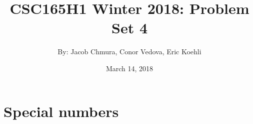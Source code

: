 \documentclass[12pt, a4paper]{amsart}
\theoremstyle{definition}
\theoremstyle{remark}
\numberwithin{Theorem}{section}
\begin{document}
\title{CSC165H1 Winter 2018: Problem Set 4}
\author{By: Jacob Chmura, Conor Vedova, Eric Koehli}
\date{March 14, 2018}
\maketitle
\newpage


\section{Special numbers}
\end{document}
